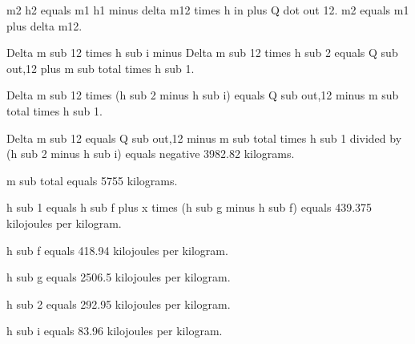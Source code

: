 m2 h2 equals m1 h1 minus delta m12 times h in plus Q dot out 12.  
m2 equals m1 plus delta m12.

Delta m sub 12 times h sub i minus Delta m sub 12 times h sub 2 equals Q sub out,12 plus m sub total times h sub 1.  

Delta m sub 12 times (h sub 2 minus h sub i) equals Q sub out,12 minus m sub total times h sub 1.  

Delta m sub 12 equals Q sub out,12 minus m sub total times h sub 1 divided by (h sub 2 minus h sub i) equals negative 3982.82 kilograms.  

m sub total equals 5755 kilograms.  

h sub 1 equals h sub f plus x times (h sub g minus h sub f) equals 439.375 kilojoules per kilogram.  

h sub f equals 418.94 kilojoules per kilogram.  

h sub g equals 2506.5 kilojoules per kilogram.  

h sub 2 equals 292.95 kilojoules per kilogram.  

h sub i equals 83.96 kilojoules per kilogram.